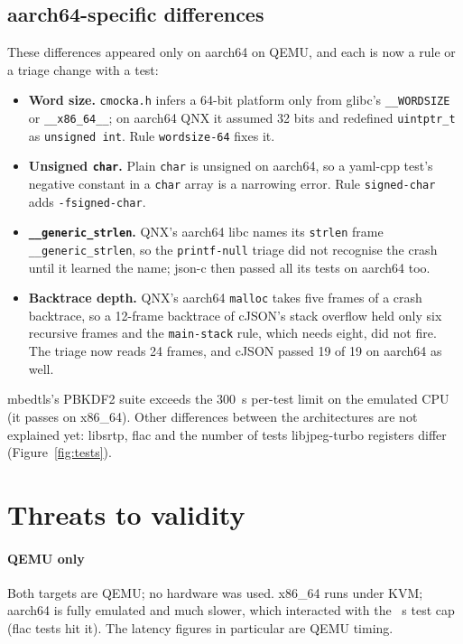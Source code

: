 \documentclass[conference]{IEEEtran}
\begin{document}
\subsection{aarch64-specific differences}\label{sec:findings-arm}
These differences appeared only on aarch64 on QEMU, and each is now a rule or a triage change with a test:
\begin{itemize}
\item \textbf{Word size.} \texttt{cmocka.h} infers a 64-bit platform only from glibc's \texttt{\_\_WORDSIZE} or
\texttt{\_\_x86\_64\_\_}; on aarch64 QNX it assumed 32 bits and redefined \texttt{uintptr\_t} as
\texttt{unsigned int}. Rule \texttt{wordsize-64} fixes it.
\item \textbf{Unsigned \texttt{char}.} Plain \texttt{char} is unsigned on aarch64, so a yaml-cpp test's negative
constant in a \texttt{char} array is a narrowing error. Rule \texttt{signed-char} adds \texttt{-fsigned-char}.
\item \textbf{\texttt{\_\_generic\_strlen}.} QNX's aarch64 libc names its \texttt{strlen} frame
\texttt{\_\_generic\_strlen}, so the \texttt{printf-null} triage did not recognise the crash until it learned the
name; json-c then passed all its tests on aarch64 too.
\item \textbf{Backtrace depth.} QNX's aarch64 \texttt{malloc} takes five frames of a crash backtrace, so a
12-frame backtrace of cJSON's stack overflow held only six recursive frames and the \texttt{main-stack} rule,
which needs eight, did not fire. The triage now reads 24 frames, and cJSON passed 19 of 19 on aarch64 as well.
\end{itemize}
mbedtls's PBKDF2 suite exceeds the 300~s per-test limit on the emulated CPU (it passes on x86\_64). Other
differences between the architectures are not explained yet: libsrtp, flac and the number of tests
libjpeg-turbo registers differ (Figure~\ref{fig:tests}).

\section{Threats to validity}\label{sec:threats}

\paragraph{QEMU only} Both targets are QEMU; no hardware was used. x86\_64 runs under KVM; aarch64 is fully
emulated and much slower, which interacted with the ~s test cap (flac tests hit it). The
latency figures in particular are QEMU timing.
\end{document}
